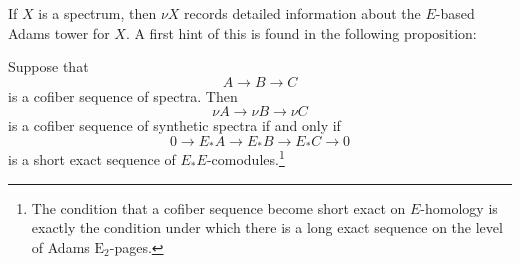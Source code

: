 If $X$ is a spectrum, then $\nu X$ records detailed information about the $E$-based Adams tower for $X$.  A first hint of this is found in the following proposition:

\begin{lem}   \label{lemm:syn-cof}
  Suppose that
  $$ A \to B \to C $$
	is a cofiber sequence of spectra. Then
  $$ \nu A \to \nu B \to \nu C $$
	is a cofiber sequence of synthetic spectra if and only if
  $$ 0 \to E_*A \to E_*B \to E_*C \to 0 $$
  is a short exact sequence of $E_*E$-comodules.\footnote{The condition that a cofiber sequence become short exact on $E$-homology is exactly the condition under which there is a long exact sequence on the level of Adams $\mathrm{E}_2$-pages.}
\end{lem}

